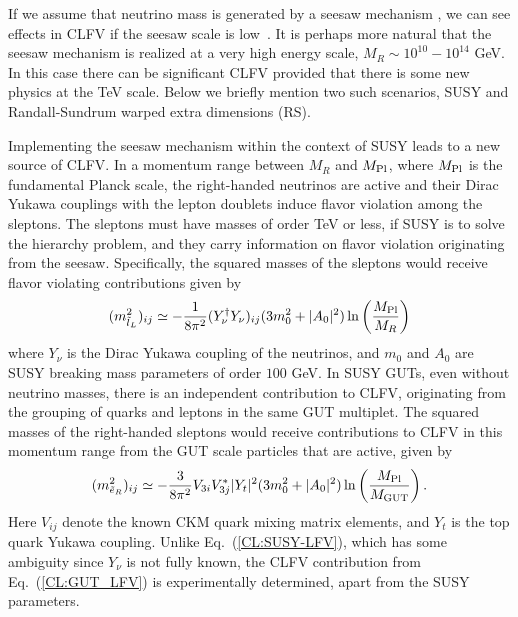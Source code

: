 

If we assume that neutrino mass is generated by a seesaw mechanism \cite{Minkowski:1977sc}, we can see effects in CLFV if the seesaw scale is low~\cite{de
Gouvea:2007uz}. It is perhaps more natural that the seesaw mechanism
is realized at a very high energy scale, $M_R \sim 10^{10} - 10^{14}$
GeV. In this case there can be significant CLFV provided that there is
some new physics at the TeV scale. Below we briefly mention two such
scenarios, SUSY and Randall-Sundrum warped extra dimensions (RS).

Implementing the seesaw mechanism within the context of SUSY leads to
a new source of CLFV. In a momentum range  between $M_R$ and  $M_{\rm
Pl}$, where $M_{\rm Pl}$ is the fundamental Planck scale, the
right-handed neutrinos are active and their Dirac
Yukawa couplings with the lepton doublets induce flavor
violation among the sleptons.  The sleptons must have masses of order
TeV or less, if SUSY is to solve the hierarchy problem, and they carry
information on flavor violation originating from the seesaw.
Specifically, the squared masses of the sleptons would receive flavor
violating contributions given by
\begin{equation}
(m_{\tilde{l}_{L}}^{2})_{ij} \simeq -\frac{1}{8\pi^{2}}
(Y_{\nu}^\dagger Y_{\nu})_{ij} (3 m_{0}^{2} + |A_{0}|^{2})\ln\left({M_{\rm
Pl}\over M_{R}}\right)
\label{CL:SUSY-LFV}
\end{equation}
where $Y_\nu$ is the Dirac Yukawa coupling of the neutrinos, and $m_0$
and $A_0$ are SUSY breaking mass parameters of order $100$ GeV.  In
SUSY GUTs, even without neutrino masses, there is an independent
contribution to CLFV, originating from the grouping of quarks and
leptons in the same GUT multiplet.   The squared masses of
the right-handed sleptons would receive contributions to CLFV in this momentum range from the GUT
scale particles that are active, given by
\begin{equation}
(m_{\tilde{e}_{R}}^{2})_{ij} \simeq -\frac{3}{8\pi^{2}}
V_{3i}V_{3j}^{*}|Y_t|^{2}(3 m_{0}^{2}  +
|A_{0}|^{2})\ln\left(\frac{M_{\rm Pl}}{M_{{\rm GUT}}}\right).
\label{CL:GUT_LFV}
\end{equation}
Here $V_{ij}$ denote the known CKM quark mixing matrix elements, and
$Y_t$ is the top quark Yukawa coupling.  Unlike
Eq.~(\ref{CL:SUSY-LFV}), which has some ambiguity since $Y_\nu$ is not
fully known, the CLFV contribution from Eq.~(\ref{CL:GUT_LFV}) is
experimentally determined, apart from the SUSY parameters. 

